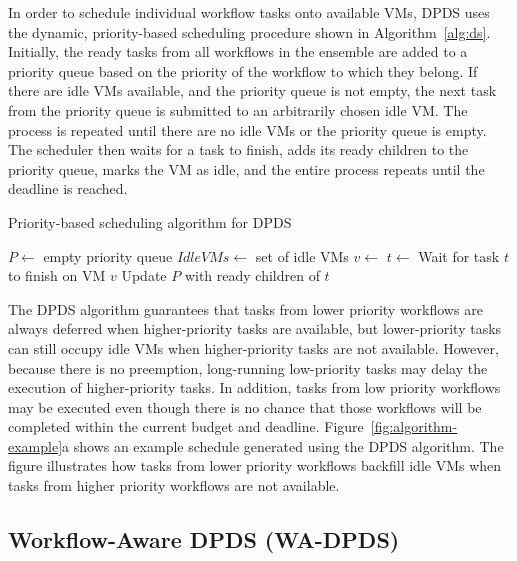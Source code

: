\documentclass[conference]{IEEEtran}
\begin{document}
In order to schedule individual workflow tasks onto available VMs, DPDS uses the
dynamic, priority-based scheduling procedure shown in Algorithm~\ref{alg:ds}.
Initially, the ready tasks from all workflows in the ensemble are added to a
priority queue based on the priority of the workflow to which they belong. If
there are idle VMs available, and the priority queue is not empty, the next task
from the priority queue is submitted to an arbitrarily chosen idle VM. The
process is repeated until there are no idle VMs or the priority queue is empty.
The scheduler then waits for a task to finish, adds its ready children to the
priority queue, marks the VM as idle, and the entire process repeats until the
deadline is reached.

\begin{algorithm}[tb]
\caption{Priority-based scheduling algorithm for DPDS}
\label{alg:ds}
{\footnotesize
\begin{algorithmic}[1]
    \State $P\gets$ empty priority queue
	\State $IdleVMs\gets$ set of idle VMs
    	\State {} 
    \EndFor
    		\State $v\gets$ 
    		\State $t\gets$ 
    		\State {}
    	\EndWhile
    	\State Wait for task $t$ to finish on VM $v$
    	\State Update $P$ with ready children of $t$
		\State {}
    \EndWhile
\EndProcedure
\end{algorithmic}
}
\end{algorithm}


The DPDS algorithm guarantees that tasks from lower priority workflows are
always deferred when higher-priority tasks are available, but lower-priority
tasks can still occupy idle VMs when higher-priority tasks are not available.
However, because there is no preemption, long-running low-priority tasks may
delay the execution of higher-priority tasks. In addition, tasks from low
priority workflows may be executed even though there is no chance that those
workflows will be completed within the current budget and deadline.
Figure~\ref{fig:algorithm-example}a shows an example schedule generated using
the DPDS algorithm. The figure illustrates how tasks from lower priority workflows
backfill idle VMs when tasks from higher priority workflows are not available.



\subsection{Workflow-Aware DPDS (WA-DPDS)}
\end{document}
